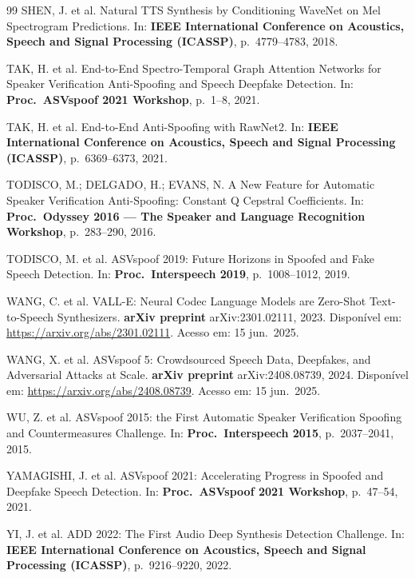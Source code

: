 \documentclass[12pt,a4paper]{article}
\begin{document}
\begin{thebibliography}{99}
SHEN, J. et al.
Natural TTS Synthesis by Conditioning WaveNet on Mel Spectrogram Predictions.
In: \textbf{IEEE International Conference on Acoustics, Speech and Signal
Processing (ICASSP)}, p.~4779--4783, 2018.

TAK, H. et al.
End-to-End Spectro-Temporal Graph Attention Networks for Speaker Verification
Anti-Spoofing and Speech Deepfake Detection.
In: \textbf{Proc.\ ASVspoof 2021 Workshop}, p.~1--8, 2021.

TAK, H. et al.
End-to-End Anti-Spoofing with RawNet2.
In: \textbf{IEEE International Conference on Acoustics, Speech and Signal
Processing (ICASSP)}, p.~6369--6373, 2021.

TODISCO, M.; DELGADO, H.; EVANS, N.
A New Feature for Automatic Speaker Verification Anti-Spoofing:
Constant Q Cepstral Coefficients.
In: \textbf{Proc.\ Odyssey 2016 --- The Speaker and Language Recognition
Workshop}, p.~283--290, 2016.

TODISCO, M. et al.
ASVspoof 2019: Future Horizons in Spoofed and Fake Speech Detection.
In: \textbf{Proc.\ Interspeech 2019}, p.~1008--1012, 2019.

WANG, C. et al.
VALL-E: Neural Codec Language Models are Zero-Shot Text-to-Speech Synthesizers.
\textbf{arXiv preprint} arXiv:2301.02111, 2023.
Disponível em: \url{https://arxiv.org/abs/2301.02111}.
Acesso em: 15 jun.\ 2025.

WANG, X. et al.
ASVspoof 5: Crowdsourced Speech Data, Deepfakes, and Adversarial Attacks at
Scale.
\textbf{arXiv preprint} arXiv:2408.08739, 2024.
Disponível em: \url{https://arxiv.org/abs/2408.08739}.
Acesso em: 15 jun.\ 2025.

WU, Z. et al.
ASVspoof 2015: the First Automatic Speaker Verification Spoofing and
Countermeasures Challenge.
In: \textbf{Proc.\ Interspeech 2015}, p.~2037--2041, 2015.

YAMAGISHI, J. et al.
ASVspoof 2021: Accelerating Progress in Spoofed and Deepfake Speech Detection.
In: \textbf{Proc.\ ASVspoof 2021 Workshop}, p.~47--54, 2021.

YI, J. et al.
ADD 2022: The First Audio Deep Synthesis Detection Challenge.
In: \textbf{IEEE International Conference on Acoustics, Speech and Signal
Processing (ICASSP)}, p.~9216--9220, 2022.

\end{thebibliography}
\end{document}
